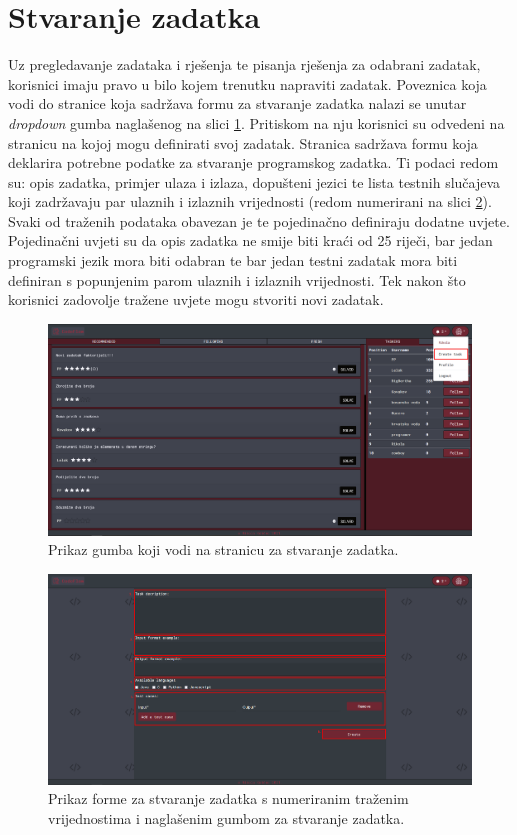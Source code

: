 \documentclass[times, utf8, zavrsni, numeric]{fer}
\begin{document}
		\section{Stvaranje zadatka}
		Uz pregledavanje zadataka i rješenja te pisanja rješenja za odabrani zadatak, korisnici imaju pravo u bilo kojem trenutku napraviti zadatak. Poveznica koja vodi do stranice koja sadržava formu za stvaranje zadatka nalazi se unutar \textit{dropdown} gumba naglašenog na slici \ref{fig:dropdowntask}. Pritiskom na nju korisnici su odvedeni na stranicu na kojoj mogu definirati svoj zadatak. Stranica sadržava formu koja deklarira potrebne podatke za stvaranje programskog zadatka. Ti podaci redom su: opis zadatka, primjer ulaza i izlaza, dopušteni jezici te lista testnih slučajeva koji zadržavaju par ulaznih i izlaznih vrijednosti (redom numerirani na slici \ref{fig:stvaranjeforma}). Svaki od traženih podataka obavezan je te pojedinačno definiraju dodatne uvjete. Pojedinačni uvjeti su da opis zadatka ne smije biti kraći od 25 riječi, bar jedan programski jezik mora biti odabran te bar jedan testni zadatak mora biti definiran s popunjenim parom ulaznih i izlaznih vrijednosti. Tek nakon što korisnici zadovolje tražene uvjete mogu stvoriti novi zadatak.
		\begin{figure}[H]
			\centering
			\includegraphics[width=\linewidth]{pictures/koristenje/StvoriDropdown.png}
			\caption{Prikaz gumba koji vodi na stranicu za stvaranje zadatka.}
			\label{fig:dropdowntask}
		\end{figure}
		\begin{figure}[H]
			\centering
			\includegraphics[width=\linewidth]{pictures/koristenje/FormaStvaranja.png}
			\caption{Prikaz forme za stvaranje zadatka s numeriranim traženim vrijednostima i naglašenim gumbom za stvaranje zadatka.}
			\label{fig:stvaranjeforma}
		\end{figure}
		
\end{document}
